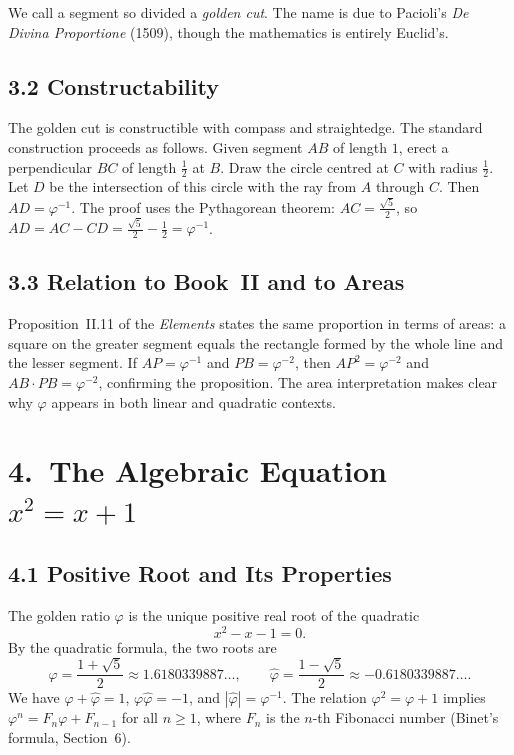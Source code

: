 We call a segment so divided a \emph{golden cut}.
The name is due to Pacioli's \emph{De Divina
Proportione} (1509), though the mathematics is
entirely Euclid's.

\subsection{3.2 Constructability}
\label{subsec:gc-constructability}

The golden cut is constructible with compass and
straightedge.
The standard construction proceeds as follows.
Given segment $AB$ of length $1$, erect a perpendicular
$BC$ of length $\tfrac{1}{2}$ at $B$.
Draw the circle centred at $C$ with radius $\tfrac{1}{2}$.
Let $D$ be the intersection of this circle with the
ray from $A$ through $C$.
Then $AD = \varphi^{-1}$.
The proof uses the Pythagorean theorem:
$AC = \tfrac{\sqrt{5}}{2}$,
so $AD = AC - CD = \tfrac{\sqrt{5}}{2} - \tfrac{1}{2} = \varphi^{-1}$.

\subsection{3.3 Relation to Book~II and to Areas}
\label{subsec:gc-areas}

Proposition~II.11 of the \emph{Elements} states the
same proportion in terms of areas: a square on the
greater segment equals the rectangle formed by the
whole line and the lesser segment.
If $AP = \varphi^{-1}$ and $PB = \varphi^{-2}$, then
$AP^2 = \varphi^{-2}$ and $AB \cdot PB = \varphi^{-2}$,
confirming the proposition.
The area interpretation makes clear why $\varphi$
appears in both linear and quadratic contexts.

\section{4.\ The Algebraic Equation $x^2 = x + 1$}
\label{sec:gc-algebra}

\subsection{4.1 Positive Root and Its Properties}
\label{subsec:gc-algebra-root}

The golden ratio $\varphi$ is the unique positive real
root of the quadratic
\[
  x^2 - x - 1 = 0.
\]
By the quadratic formula, the two roots are
\[
  \varphi = \frac{1+\sqrt{5}}{2} \approx 1.6180339887\ldots,
  \qquad
  \hat\varphi = \frac{1-\sqrt{5}}{2} \approx -0.6180339887\ldots.
\]
We have $\varphi + \hat\varphi = 1$,
$\varphi \hat\varphi = -1$, and
$|\hat\varphi| = \varphi^{-1}$.
The relation $\varphi^2 = \varphi + 1$ implies
$\varphi^n = F_n \varphi + F_{n-1}$ for all $n \geq 1$,
where $F_n$ is the $n$-th Fibonacci number
(Binet's formula, Section~6).

